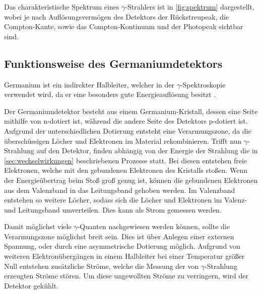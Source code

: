 Das charakteristische Spektrum eines $\gamma$-Strahlers ist in \autoref{fig:spektrum} dargestellt,
wobei je nach Auflösungsvermögen des Detektors der Rückstreupeak,
die Compton-Kante,
sowie das Compton-Kontinuum und der Photopeak sichtbar sind.

\subsection{Funktionsweise des Germaniumdetektors}
\label{sec:funktionsweise}

Germanium ist ein indirekter Halbleiter,
welcher in der $\gamma$-Spektroskopie verwendet wird,
da er eine besonders gute Energieauflösung besitzt \cite{kolanoskiwermes}.

Der Germaniumdetektor besteht aus einem Germanium-Kristall,
dessen eine Seite mithilfe von n-dotiert ist,
während die andere Seite des Detektors p-dotiert ist.
Aufgrund der unterschiedlichen Dotierung entsteht eine Verarmungszone,
da die überschüssigen Löcher und Elektronen im Material rekombinieren.
Trifft nun $\gamma$-Strahlung auf den Detektor,
finden abhängig von der Energie der Strahlung die in \autoref{sec:wechselwirkungen} beschriebenen Prozesse statt.
Bei diesen entstehen freie Elektronen,
welche mit den gebundenen Elektronen des Kristalls stoßen.
Wenn der Energieübertrag beim Stoß groß genug ist,
können die gebundenen Elektronen aus dem Valenzband in das Leitungsband gehoben werden.
Im Valenzband entstehen so weitere Löcher,
sodass sich die Löcher und Elektronen im Valenz- und Leitungsband umverteilen.
Dies kann als Strom gemessen werden.

Damit möglichst viele $\gamma$-Quanten nachgewiesen werden können,
sollte die Verarmungszone möglichst breit sein.
Dies ist über Anlegen einer externen Spannung,
oder durch eine asymmetrische Dotierung möglich.
Aufgrund von weiteren Elektronübergängen in einem Halbleiter bei einer Temperatur größer Null entstehen zusätzliche Ströme,
welche die Messung der von $\gamma$-Strahlung erzeugten Ströme stören.
Um diese ungewollten Ströme zu verringern,
wird der Detektor gekühlt.